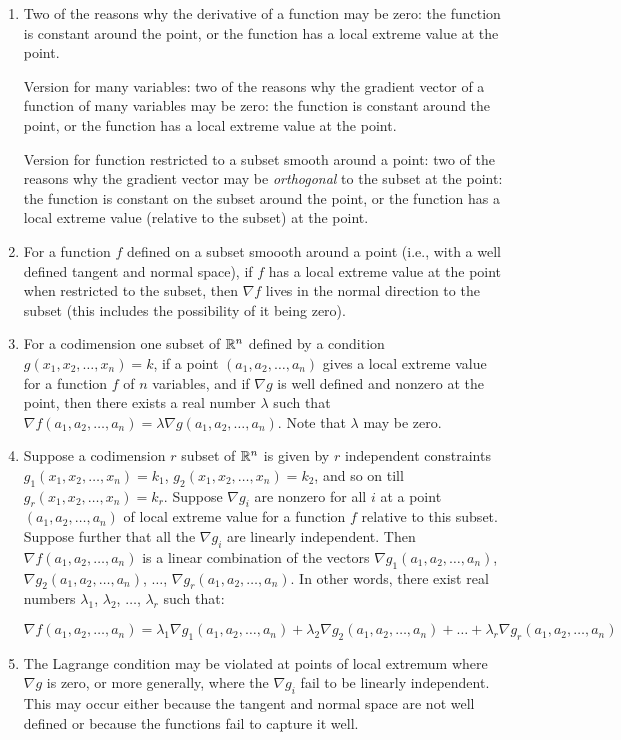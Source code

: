 \documentclass[10pt]{amsart}
\begin{document}
\begin{enumerate}
\item Two of the reasons why the derivative of a function may be zero:
  the function is constant around the point, or the function has a local
  extreme value at the point.

  Version for many variables: two of the reasons why the gradient
  vector of a function of many variables may be zero: the function is
  constant around the point, or the function has a local extreme value
  at the point.

  Version for function restricted to a subset smooth around a point:
  two of the reasons why the gradient vector may be {\em orthogonal}
  to the subset at the point: the function is constant on the subset
  around the point, or the function has a local extreme value
  (relative to the subset) at the point.
\item For a function $f$ defined on a subset smoooth around a point
  (i.e., with a well defined tangent and normal space), if $f$ has a
  local extreme value at the point when restricted to the subset, then
  $\nabla f$ lives in the normal direction to the subset (this
  includes the possibility of it being zero).
\item For a codimension one subset of $\mathbb{R}^n$ defined by a condition
  $g(x_1,x_2,\dots,x_n) = k$, if a point $(a_1,a_2,\dots,a_n)$ gives a
  local extreme value for a function $f$ of $n$ variables, and if
  $\nabla g$ is well defined and nonzero at the point, then there
  exists a real number $\lambda$ such that $\nabla
  f(a_1,a_2,\dots,a_n) = \lambda \nabla g(a_1,a_2,\dots,a_n)$. Note
  that $\lambda$ may be zero.
\item Suppose a codimension $r$ subset of $\mathbb{R}^n$ is given by $r$
  independent constraints $g_1(x_1,x_2,\dots,x_n) = k_1$,
  $g_2(x_1,x_2,\dots,x_n) = k_2$, and so on till
  $g_r(x_1,x_2,\dots,x_n) = k_r$. Suppose $\nabla g_i$ are nonzero for
  all $i$ at a point $(a_1,a_2,\dots,a_n)$ of local extreme value for
  a function $f$ relative to this subset. Suppose further that all the
  $\nabla g_i$ are linearly independent. Then $\nabla
  f(a_1,a_2,\dots,a_n)$ is a linear combination of the vectors $\nabla
  g_1(a_1,a_2,\dots,a_n)$, $\nabla g_2(a_1,a_2,\dots,a_n)$, $\dots$,
  $\nabla g_r(a_1,a_2,\dots,a_n)$. In other words, there exist real
  numbers $\lambda_1$, $\lambda_2$, $\dots$, $\lambda_r$ such that:

  $$\nabla f(a_1,a_2,\dots,a_n) = \lambda_1\nabla g_1(a_1,a_2,\dots,a_n) + \lambda_2\nabla g_2(a_1,a_2,\dots,a_n) + \dots + \lambda_r\nabla g_r(a_1,a_2,\dots,a_n)$$
\item The Lagrange condition may be violated at points of local
  extremum where $\nabla g$ is zero, or more generally, where the
  $\nabla g_i$ fail to be linearly independent. This may occur either
  because the tangent and normal space are not well defined or because
  the functions fail to capture it well.
\end{enumerate}
\end{document}
